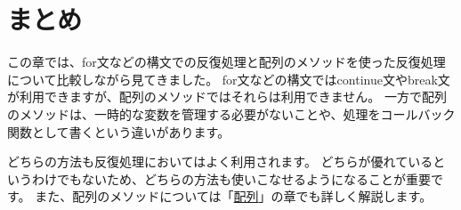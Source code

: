 \newpage
\hypertarget{conclusion}{%
\section{まとめ}\label{conclusion}}

この章では、for文などの構文での反復処理と配列のメソッドを使った反復処理について比較しながら見てきました。
for文などの構文ではcontinue文やbreak文が利用できますが、配列のメソッドではそれらは利用できません。
一方で配列のメソッドは、一時的な変数を管理する必要がないことや、処理をコールバック関数として書くという違いがあります。

どちらの方法も反復処理においてはよく利用されます。
どちらが優れているというわけでもないため、どちらの方法も使いこなせるようになることが重要です。
また、配列のメソッドについては「\hyperlink{array}{配列}」の章でも詳しく解説します。
